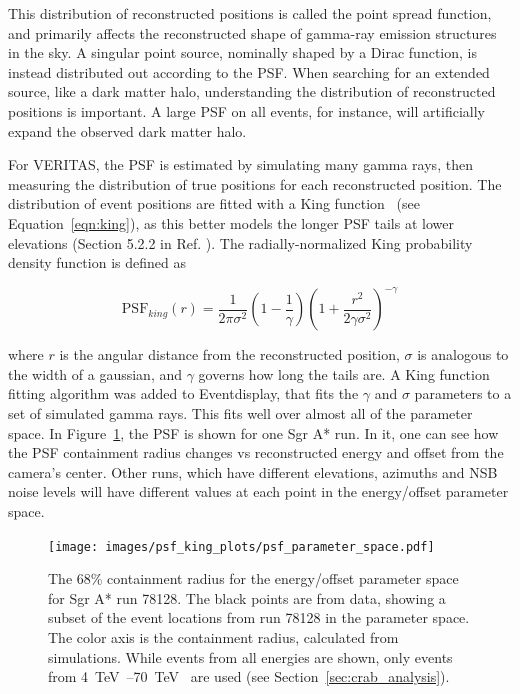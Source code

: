     This distribution of reconstructed positions is called the point spread function, and primarily affects the reconstructed shape of gamma-ray emission structures in the sky.
    A singular point source, nominally shaped by a Dirac function, is instead distributed out according to the PSF.
    When searching for an extended source, like a dark matter halo, understanding the distribution of reconstructed positions is important.
    A large PSF on all events, for instance, will artificially expand the observed dark matter halo.

    For VERITAS, the PSF is estimated by simulating many gamma rays, then measuring the distribution of true positions for each reconstructed position.
    The distribution of event positions are fitted with a King function~\cite{king1962} (see Equation~\ref{eqn:king}), as this better models the longer PSF tails at lower elevations (Section 5.2.2 in Ref. \cite{Mayer2015}).
    The radially-normalized King probability density function is defined as

    \begin{equation} \label{eqn:king}
    \text{PSF}_{king}(r) = \frac{1}{2 \pi \sigma^{2} } \left( 1 - \frac{1}{\gamma} \right) \left( 1 + \frac{ r^{2} }{ 2 \gamma \sigma^{2} } \right)^{-\gamma}
    \end{equation}

    where $r$ is the angular distance from the reconstructed position, $\sigma$ is analogous to the width of a gaussian, and $\gamma$ governs how long the tails are.
    A King function fitting algorithm was added to Eventdisplay, that fits the $\gamma$ and $\sigma$ parameters to a set of simulated gamma rays.
    This fits well over almost all of the parameter space.
    In Figure~\ref{fig:psf_paramspace}, the PSF is shown for one Sgr A* run.
    In it, one can see how the PSF containment radius changes vs reconstructed energy and offset from the camera's center.
    Other runs, which have different elevations, azimuths and NSB noise levels will have different values at each point in the energy/offset parameter space.

    \begin{figure}[!ht]
      \centering
      \texttt{[image: images/psf\_king\_plots/psf\_parameter\_space.pdf]}
      \caption[PSF Parameter Space]{
        The 68\% containment radius for the energy/offset parameter space for Sgr A* run 78128. 
        The black points are from data, showing a subset of the event locations from run 78128 in the parameter space.
        The color axis is the containment radius, calculated from simulations.
        While events from all energies are shown, only events from \SIrange{4}{70}{\TeV{}} are used (see Section~\ref{sec:crab_analysis}).
      }
      \label{fig:psf_paramspace}
    \end{figure}

